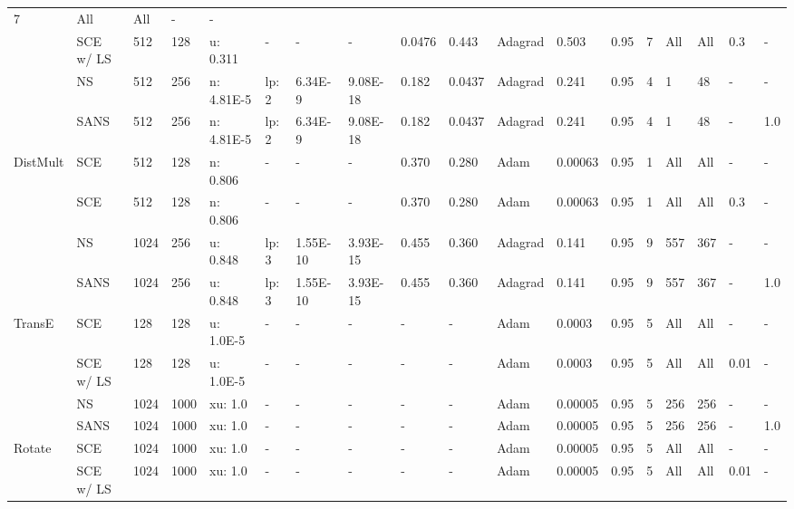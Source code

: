 \begin{table}[h!]
{\begin{tabular}{llllllllllllllllll}
  7 &
  All &
  All &
  - &
  - \\
 &
  SCE w/ LS &
  512 &
  128 &
  u: 0.311 &
  - &
  - &
  - &
  0.0476 &
  0.443 &
  Adagrad &
  0.503 &
  0.95 &
  7 &
  All &
  All &
  0.3 &
  - \\
 &
  NS &
  512 &
  256 &
  n: 4.81E-5 &
  lp: 2 &
  6.34E-9 &
  9.08E-18 &
  0.182 &
  0.0437 &
  Adagrad &
  0.241 &
  0.95 &
  4 &
  1 &
  48 &
  - &
  - \\
 &
  SANS &
  512 &
  256 &
  n: 4.81E-5 &
  lp: 2 &
  6.34E-9 &
  9.08E-18 &
  0.182 &
  0.0437 &
  Adagrad &
  0.241 &
  0.95 &
  4 &
  1 &
  48 &
  - &
  1.0 \\
  \midrule
\multirow{4}{*}{DistMult} &
  SCE &
  512 &
  128 &
  n: 0.806 &
  - &
  - &
  - &
  0.370 &
  0.280 &
  Adam &
  0.00063 &
  0.95 &
  1 &
  All &
  All &
  - &
  - \\
 &
  SCE &
  512 &
  128 &
  n: 0.806 &
  - &
  - &
  - &
  0.370 &
  0.280 &
  Adam &
  0.00063 &
  0.95 &
  1 &
  All &
  All &
  0.3 &
  - \\
 &
  NS &
  1024 &
  256 &
  u: 0.848 &
  lp: 3 &
  1.55E-10 &
  3.93E-15 &
  0.455 &
  0.360 &
  Adagrad &
  0.141 &
  0.95 &
  9 &
  557 &
  367 &
  - &
  - \\
 &
  SANS &
  1024 &
  256 &
  u: 0.848 &
  lp: 3 &
  1.55E-10 &
  3.93E-15 &
  0.455 &
  0.360 &
  Adagrad &
  0.141 &
  0.95 &
  9 &
  557 &
  367 &
  - &
  1.0 \\
  \midrule
\multirow{4}{*}{TransE} &
  SCE &
  128 &
  128 &
  u: 1.0E-5 &
  - &
  - &
  - &
  - &
  - &
  Adam &
  0.0003 &
  0.95 &
  5 &
  All &
  All &
  - &
  - \\
 &
  SCE w/ LS &
  128 &
  128 &
  u: 1.0E-5 &
  - &
  - &
  - &
  - &
  - &
  Adam &
  0.0003 &
  0.95 &
  5 &
  All &
  All &
  0.01 &
  - \\
 &
  NS &
  1024 &
  1000 &
  xu: 1.0 &
  - &
  - &
  - &
  - &
  - &
  Adam &
  0.00005 &
  0.95 &
  5 &
  256 &
  256 &
  - &
  - \\
 &
  SANS &
  1024 &
  1000 &
  xu: 1.0 &
  - &
  - &
  - &
  - &
  - &
  Adam &
  0.00005 &
  0.95 &
  5 &
  256 &
  256 &
  - &
  1.0\\
  \midrule
\multirow{4}{*}{Rotate} &
  SCE &
  1024 &
  1000 &
  xu: 1.0 &
  - &
  - &
  - &
  - &
  - &
  Adam &
  0.00005 &
  0.95 &
  5 &
  All &
  All &
  - &
  - \\
 &
  SCE w/ LS &
  1024 &
  1000 &
  xu: 1.0 &
  - &
  - &
  - &
  - &
  - &
  Adam &
  0.00005 &
  0.95 &
  5 &
  All &
  All &
  0.01 &
  - \\

\end{tabular}}
\end{table}
